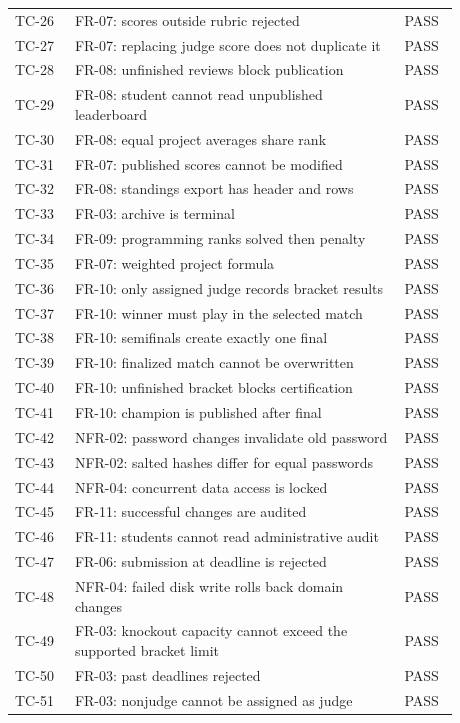 \begin{longtable}{p{0.12\linewidth}p{0.66\linewidth}p{0.1\linewidth}}
TC-26 & FR-07: scores outside rubric rejected & PASS\\
TC-27 & FR-07: replacing judge score does not duplicate it & PASS\\
TC-28 & FR-08: unfinished reviews block publication & PASS\\
TC-29 & FR-08: student cannot read unpublished leaderboard & PASS\\
TC-30 & FR-08: equal project averages share rank & PASS\\
TC-31 & FR-07: published scores cannot be modified & PASS\\
TC-32 & FR-08: standings export has header and rows & PASS\\
TC-33 & FR-03: archive is terminal & PASS\\
TC-34 & FR-09: programming ranks solved then penalty & PASS\\
TC-35 & FR-07: weighted project formula & PASS\\
TC-36 & FR-10: only assigned judge records bracket results & PASS\\
TC-37 & FR-10: winner must play in the selected match & PASS\\
TC-38 & FR-10: semifinals create exactly one final & PASS\\
TC-39 & FR-10: finalized match cannot be overwritten & PASS\\
TC-40 & FR-10: unfinished bracket blocks certification & PASS\\
TC-41 & FR-10: champion is published after final & PASS\\
TC-42 & NFR-02: password changes invalidate old password & PASS\\
TC-43 & NFR-02: salted hashes differ for equal passwords & PASS\\
TC-44 & NFR-04: concurrent data access is locked & PASS\\
TC-45 & FR-11: successful changes are audited & PASS\\
TC-46 & FR-11: students cannot read administrative audit & PASS\\
TC-47 & FR-06: submission at deadline is rejected & PASS\\
TC-48 & NFR-04: failed disk write rolls back domain changes & PASS\\
TC-49 & FR-03: knockout capacity cannot exceed the supported bracket limit & PASS\\
TC-50 & FR-03: past deadlines rejected & PASS\\
TC-51 & FR-03: nonjudge cannot be assigned as judge & PASS\\

\end{longtable}
